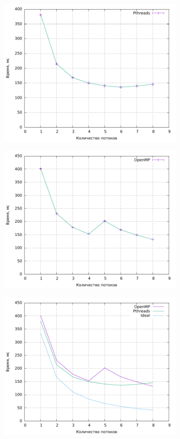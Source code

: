 \begin{figure}[H]
	\centering
	\includegraphics[width=0.8\textwidth]{../plot_clang/plotPth.pdf}
	\caption{}
\end{figure}

\begin{figure}[H]
	\centering
	\includegraphics[width=0.8\textwidth]{../plot_clang/plotMp.pdf}
	\caption{}
\end{figure}

\begin{figure}[H]
	\centering
	\includegraphics[width=0.8\textwidth]{../plot_clang/plotAll.pdf}
	\caption{}
\end{figure}

